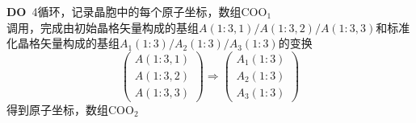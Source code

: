 \documentclass{article}      %
\begin{document}
\textbf{DO}~4循环，记录晶胞中的每个原子坐标，数组$\mathrm{COO_1}$\\
调用，完成由初始晶格矢量构成的基组$A(1:3,1)/A(1:3,2)/A(1:3,3)$和标准化晶格矢量构成的基组$A_1(1:3)/A_2(1:3)/A_3(1:3)$的变换
\begin{displaymath}
	\begin{pmatrix}
		A(1:3,1)\\A(1:3,2)\\A(1:3,3)
	\end{pmatrix}\Longrightarrow
	\begin{pmatrix}
		A_1(1:3)\\A_2(1:3)\\A_3(1:3)
	\end{pmatrix}
\end{displaymath}
得到原子坐标，数组$\mathrm{COO_2}$
\end{document}
